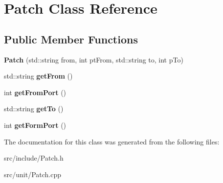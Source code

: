\hypertarget{classPatch}{\section{Patch Class Reference}
\label{classPatch}
}
\subsection*{Public Member Functions}
\begin{DoxyCompactItemize}
\item 
\hypertarget{classPatch_a5ff9de0f83c44aa11aae837870aa55f0}{{\bfseries Patch} (std\-::string from, int pt\-From, std\-::string to, int p\-To)}\label{classPatch_a5ff9de0f83c44aa11aae837870aa55f0}

\item 
\hypertarget{classPatch_a97b08ef9e08c5ef8b5d71692a7242796}{std\-::string {\bfseries get\-From} ()}\label{classPatch_a97b08ef9e08c5ef8b5d71692a7242796}

\item 
\hypertarget{classPatch_a365988c401459bfd0f0b5b21f041bfe1}{int {\bfseries get\-From\-Port} ()}\label{classPatch_a365988c401459bfd0f0b5b21f041bfe1}

\item 
\hypertarget{classPatch_ade1fb3107faa8224f29c4a8387821fee}{std\-::string {\bfseries get\-To} ()}\label{classPatch_ade1fb3107faa8224f29c4a8387821fee}

\item 
\hypertarget{classPatch_a19e489d67f86b80ac5f0ef774a3b87c8}{int {\bfseries get\-Form\-Port} ()}\label{classPatch_a19e489d67f86b80ac5f0ef774a3b87c8}

\end{DoxyCompactItemize}


The documentation for this class was generated from the following files\-:\begin{DoxyCompactItemize}
\item 
src/include/Patch.\-h\item 
src/unit/Patch.\-cpp\end{DoxyCompactItemize}
